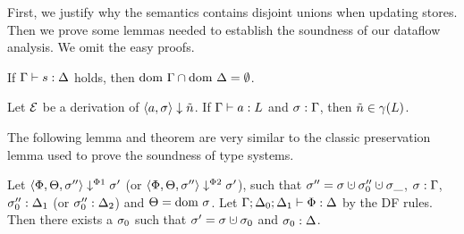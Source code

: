 First, we justify why the semantics contains disjoint unions when updating stores.
Then we prove some lemmas needed to establish the soundness of our dataflow analysis.
We omit the easy proofs.

\begin{theorem}
    \label{thm:gamma-delta-disjoint}
    If $\Gamma \vdash {s}: \Delta$ holds, then $\text{dom }{\Gamma} \cap \text{dom }{\Delta} = \emptyset$.
\end{theorem}

\begin{lemma}
    \label{lem:gamma-arithm}
    Let $\operatorname{\mathcal{E}}$ be a derivation of $\bigstep{a}{\sigma}{\flaggedn{}}$.
    If $\Gamma \vdash {a}: L$ and ${\sigma}:{\Gamma}$, then $\flaggedn{} \in \gamma(L)$.
\end{lemma}

The following lemma and theorem are very similar to the classic preservation lemma
used to prove the soundness of type systems.

\begin{lemma}
    \label{thm:preservation-phi}
    Let $\langle \Phi, \Theta, \sigma'' \rangle \downarrow^{\Phi1} \sigma'$ (or $\langle \Phi, \Theta, \sigma'' \rangle \downarrow^{\Phi2} \sigma'$),
    such that $\store'' = \store \dunion \store_0''\dunion \store{\_}$, ${\sigma}:{\Gamma}$, 
    ${\sigma_0''}:{\Delta_1}$ (or ${\sigma_0''}:{\Delta_2}$) and $\Theta = \text{dom }{\sigma}$.
    Let $\Gamma;\Delta_0;\Delta_1 \vdash {\Phi}: \Delta$ by the DF rules.
    Then there exists a $\sigma_0$ such that $\store' = \store \dunion \store_0$
    and ${\sigma_0}:{\Delta}$.
\end{lemma}

